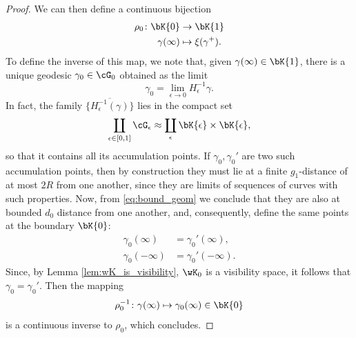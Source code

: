 \documentclass[reqno,11pt]{amsart}
\begin{document}
\begin{proof}
    We can then define a continuous bijection
        \begin{align*}
            \rho_0\colon \bK{0} &\to \bK{1} \\
            \gamma(\infty) &\mapsto \xi(\gamma^+).
        \end{align*}
    To define the inverse of this map, we note that, given \(\gamma(\infty) \in \bK{1}\), there is a unique geodesic \(\gamma_0 \in \cG_0\) obtained as the limit 
    \[
        \gamma_0 = \lim_{\epsilon \to 0}H_\epsilon^{-1}\gamma.
    \]
    In fact, the family \(\overline{\{H_\epsilon^{-1}(\gamma)\}}\) lies in the compact set
    \[
        \coprod_{\epsilon \in [0,1]}\cG_\epsilon \approx \coprod_\epsilon \bK{\epsilon}\times\bK{\epsilon},
    \]
    so that it contains all its accumulation points.
    If \(\gamma_0, \gamma_0'\) are two such accumulation points, then by construction they must lie at a finite \(g_1\)-distance of at most \(2R\) from one another, since they are limits of sequences of curves with such properties. 
    Now, from \eqref{eq:bound_geom} we conclude that they are also at bounded \(d_0\) distance from one another, and, consequently, define the same points at the boundary \(\bK{0}\):
    \[
    \begin{split}
        \gamma_0(\infty) &= \gamma_0'(\infty), \\
        \gamma_0(-\infty) &= \gamma_0'(-\infty).
    \end{split}
    \]
    Since, by Lemma \ref{lem:wK_is_visibility}, \(\wK_0\) is a visibility space, it follows that \(\gamma_0 = \gamma_0'\).
    Then the mapping
    \[
        \rho_0^{-1}\colon \gamma(\infty) \mapsto  \gamma_0(\infty) \in \bK{0}
    \]
    is a continuous inverse to \(\rho_0\), which concludes.
    \end{proof}
\end{document}
